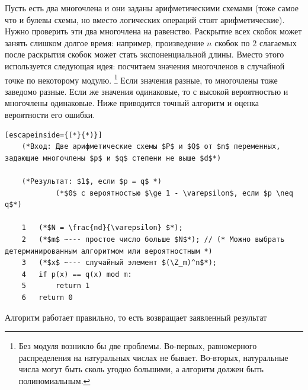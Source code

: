 Пусть есть два многочлена и они заданы арифметическими схемами (тоже самое что и булевы схемы, но вместо логических операций стоят арифметические). Нужно проверить эти два многочлена на равенство. Раскрытие всех скобок может занять слишком долгое время: например, произведение $n$ скобок по $2$ слагаемых после раскрытия скобок может стать экспоненциальной длины. Вместо этого используется следующая идея: посчитаем значения многочленов в случайной точке по некоторому модулю. \footnote{Без модуля возникло бы две проблемы. Во-первых, равномерного распределения на натуральных числах не бывает. Во-вторых, натуральные числа могут быть сколь угодно большими, а алгоритм должен быть полиномиальным.} Если значения разные, то многочлены тоже заведомо разные. Если же значения одинаковые, то с высокой вероятностью и многочлены одинаковые. Ниже приводится точный алгоритм и оценка вероятности его ошибки.

\begin{lstlisting}[escapeinside={(*}{*)}]
    (*Вход: Две арифметические схемы $P$ и $Q$ от $n$ переменных, задающие многочлены $p$ и $q$ степени не выше $d$*)

    (*Результат: $1$, если $p = q$ *)
            (*$0$ с вероятностью $\ge 1 - \varepsilon$, если $p \neq q$*)
            
    1   (*$N = \frac{nd}{\varepsilon} $*);
    2   (*$m$ ~--- простое число больше $N$*); // (* Можно выбрать детерминированным алгоритмом или вероятностным *)
    3   (*$x$ ~--- случайный элемент $(\Z_m)^n$*);
    4   if p(x) == q(x) mod m:
    5       return 1
    6   return 0
\end{lstlisting}

\begin{theorem} Алгоритм работает правильно, то есть возвращает заявленный результат
\end{theorem}

